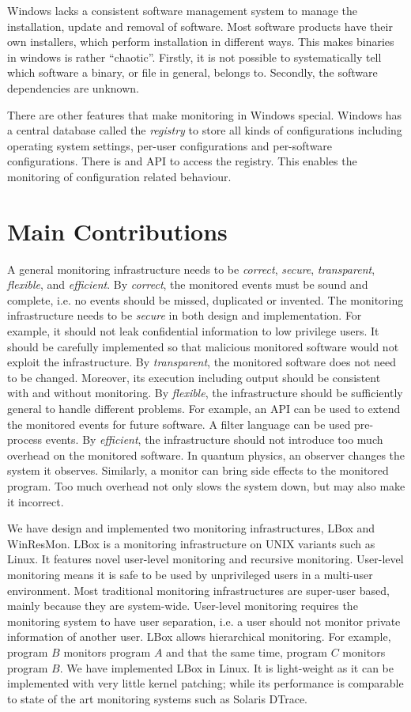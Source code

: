 Windows lacks a consistent software management system to manage
the installation, update and removal of software.
Most software products have their own installers, which perform installation in
different ways.
This makes binaries in windows is rather ``chaotic''.
Firstly, it is not possible to systematically tell which software a binary,
or file in general, belongs to.
Secondly, the software dependencies are unknown.

There are other features that make monitoring in Windows special.
Windows has a central database called the {\em registry} to store
all kinds of configurations including operating system settings,
per-user configurations and per-software configurations.
There is and API to access the registry.
This enables the monitoring of configuration related behaviour.

\section{Main Contributions}
\label{sec:contribution}

A general monitoring infrastructure needs to be
{\em correct}, {\em secure}, {\em transparent}, {\em flexible}, and {\em efficient}.
By {\em correct}, the monitored events must be sound and complete, i.e.
no events should be missed, duplicated or invented.
The monitoring infrastructure needs to be {\em secure} in both design and implementation.
For example, it should not leak confidential information to low privilege users.
It should be carefully implemented so that malicious monitored
software would not exploit the infrastructure.
By {\em transparent}, the monitored software does not need to be changed.
Moreover, its execution including output should be consistent with and without
monitoring.
By {\em flexible}, the infrastructure should be sufficiently general to
handle different problems.
For example, an API can be used to extend the monitored events for future software.
A filter language can be used pre-process events.
By {\em efficient}, the infrastructure should not introduce too much
overhead on the monitored software.
In quantum physics, an observer changes the system it observes.
Similarly, a monitor can bring side effects to the monitored program.
Too much overhead not only slows the system down, but may also make
it incorrect.

We have design and implemented two monitoring infrastructures,
LBox and WinResMon.
LBox \cite{wu2005user} is a monitoring infrastructure on UNIX variants such as Linux.
It features novel user-level monitoring and recursive monitoring.
User-level monitoring means it is
safe to be used by unprivileged users in a multi-user environment.
Most traditional monitoring infrastructures are super-user based,
mainly because they are system-wide.
User-level monitoring requires the monitoring system to have user separation,
i.e. a user should not monitor private information of another user.
LBox allows hierarchical monitoring.
For example, program $B$ monitors program $A$ and that the same time,
program $C$ monitors program $B$.
We have implemented LBox in Linux.
It is light-weight as it can be implemented with very little kernel patching;
while its performance is comparable to state of the art monitoring systems
such as Solaris DTrace.

